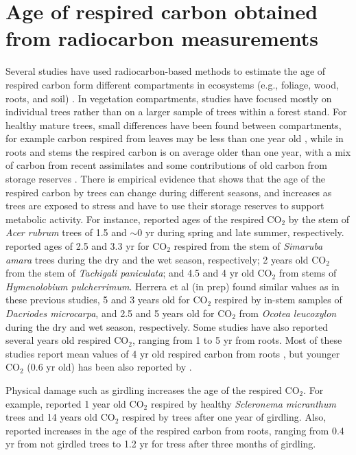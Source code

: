\documentclass[bg, manuscript]{copernicus}
\begin{document}
\section{Age of respired carbon obtained from radiocarbon measurements}
Several studies have used radiocarbon-based methods to estimate the age of respired carbon form different compartments in ecosystems (e.g., foliage, wood, roots, and soil) \citep{carbone:2007, Carbone:200713, carbone:2013, muhr:2013, Muhr:2018, Trumbore:2015}. 
In vegetation compartments, studies have focused mostly on individual trees rather than on a larger sample of trees within a forest stand. For healthy mature trees, small differences have been found between compartments, for example carbon respired from leaves may be less than one year old \citep{carbone:2007}, while in roots and stems the respired carbon is on average older than one year, with a mix of carbon from recent assimilates and some contributions of old carbon from storage reserves \citep{Muhr:2018}. There is empirical evidence that shows that the age of the respired carbon by trees can change during different seasons, and increases as trees are exposed to stress and have to use their storage reserves to support metabolic activity.  For instance, \citet{carbone:2013} reported ages of the respired CO$_2$ by the stem of \textit{Acer rubrum} trees of 1.5 and  $\sim$0 yr during spring and late summer, respectively. \citet{muhr:2013} reported ages of 2.5 and 3.3 yr for CO$_2$ respired from the stem of \textit{Simaruba amara} trees during the dry and the wet season, respectively; 2 years old CO$_2$ from the stem of \textit{Tachigali paniculata}; and 4.5 and 4 yr old CO$_2$ from stems of \textit{Hymenolobium pulcherrimum}. Herrera et al (in prep) found similar values as in these previous studies, 5 and 3 years old for CO$_2$ respired by in-stem samples of \textit{Dacriodes microcarpa}, and 2.5 and 5 years old for CO$_2$ from \textit{Ocotea leucoxylon} during the dry  and wet season, respectively. Some studies have also reported several years old respired CO$_2$, ranging from 1 to 5 yr from roots. Most of these studies report mean values of 4 yr old respired carbon from roots \citep{CZIMCZIK:2006td, Schuur:2006tm, carbone:2007}, but younger CO$_2$ (0.6 yr old) has been also reported by \citet{Hilman:2021us}. 

Physical damage such as girdling increases the age of the respired CO$_2$. For example, \citet{Muhr:2018} reported 1 year old CO$_2$ respired by healthy \textit{Scleronema micranthum} trees and 14 years old CO$_2$ respired by trees after one year of girdling. Also, \citet{Hilman:2021us} reported increases in the age of the respired carbon from roots, ranging from 0.4 yr from not girdled trees to 1.2 yr for tress after three months of girdling.  
\end{document}
